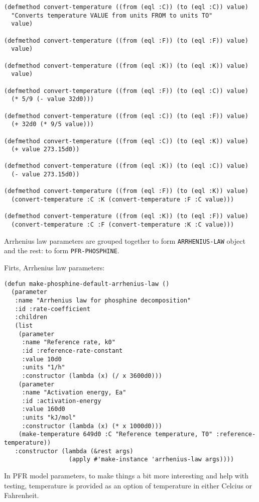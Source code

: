 \documentclass[listings, a4paper, fleqn, pdftex, 12pt, openany, oneside, final]{memoir}
\theoremstyle{definition}
\begin{document}
\begin{verbatim}
(defmethod convert-temperature ((from (eql :C)) (to (eql :C)) value)
  "Converts temperature VALUE from units FROM to units TO"
  value)

(defmethod convert-temperature ((from (eql :F)) (to (eql :F)) value)
  value)

(defmethod convert-temperature ((from (eql :K)) (to (eql :K)) value)
  value)

(defmethod convert-temperature ((from (eql :F)) (to (eql :C)) value)
  (* 5/9 (- value 32d0)))

(defmethod convert-temperature ((from (eql :C)) (to (eql :F)) value)
  (+ 32d0 (* 9/5 value)))

(defmethod convert-temperature ((from (eql :C)) (to (eql :K)) value)
  (+ value 273.15d0))

(defmethod convert-temperature ((from (eql :K)) (to (eql :C)) value)
  (- value 273.15d0))

(defmethod convert-temperature ((from (eql :F)) (to (eql :K)) value)
  (convert-temperature :C :K (convert-temperature :F :C value)))

(defmethod convert-temperature ((from (eql :K)) (to (eql :F)) value)
  (convert-temperature :C :F (convert-temperature :K :C value)))
\end{verbatim}



Arrhenius law
parameters are grouped together to form \texttt{ARRHENIUS-LAW} object and the
rest: to form \texttt{PFR-PHOSPHINE}.

Firts, Arrhenius law parameters:

\begin{verbatim}
(defun make-phosphine-default-arrhenius-law ()
  (parameter
   :name "Arrhenius law for phosphine decomposition"
   :id :rate-coefficient
   :children
   (list
    (parameter
     :name "Reference rate, k0"
     :id :reference-rate-constant
     :value 10d0
     :units "1/h"
     :constructor (lambda (x) (/ x 3600d0)))
    (parameter
     :name "Activation energy, Ea"
     :id :activation-energy
     :value 160d0
     :units "kJ/mol"
     :constructor (lambda (x) (* x 1000d0)))
    (make-temperature 649d0 :C "Reference temperature, T0" :reference-temperature))
   :constructor (lambda (&rest args)
                  (apply #'make-instance 'arrhenius-law args))))
\end{verbatim}

In PFR model parameters, to make things a bit more interesting and
help with testing, temperature is provided as an option of temperature
in either Celcius or Fahrenheit.
\end{document}

